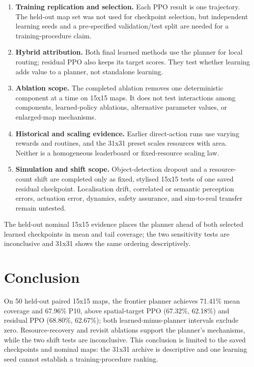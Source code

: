 \documentclass[10pt,letterpaper]{article}
\begin{document}
\begin{enumerate}
    \item \textbf{Training replication and selection.} Each PPO result is one trajectory. The held-out map set was not used for checkpoint selection, but independent learning seeds and a pre-specified validation/test split are needed for a training-procedure claim.
    \item \textbf{Hybrid attribution.} Both final learned methods use the planner for local routing; residual PPO also keeps its target scores. They test whether learning adds value to a planner, not standalone learning.
    \item \textbf{Ablation scope.} The completed ablation removes one deterministic component at a time on 15x15 maps. It does not test interactions among components, learned-policy ablations, alternative parameter values, or enlarged-map mechanisms.
    \item \textbf{Historical and scaling evidence.} Earlier direct-action runs use varying rewards and routines, and the 31x31 preset scales resources with area. Neither is a homogeneous leaderboard or fixed-resource scaling law.
    \item \textbf{Simulation and shift scope.} Object-detection dropout and a resource-count shift are completed only as fixed, stylised 15x15 tests of one saved residual checkpoint. Localisation drift, correlated or semantic perception errors, actuation error, dynamics, safety assurance, and sim-to-real transfer remain untested.
\end{enumerate}

The held-out nominal 15x15 evidence places the planner ahead of both selected learned checkpoints in mean and tail coverage; the two sensitivity tests are inconclusive and 31x31 shows the same ordering descriptively.

\section{Conclusion}

On 50 held-out paired 15x15 maps, the frontier planner achieves 71.41\% mean coverage and 67.96\% P10, above spatial-target PPO (67.32\%, 62.18\%) and residual PPO (68.80\%, 62.67\%); both learned-minus-planner intervals exclude zero. Resource-recovery and revisit ablations support the planner's mechanisms, while the two shift tests are inconclusive. This conclusion is limited to the saved checkpoints and nominal maps: the 31x31 archive is descriptive and one learning seed cannot establish a training-procedure ranking.
\end{document}
